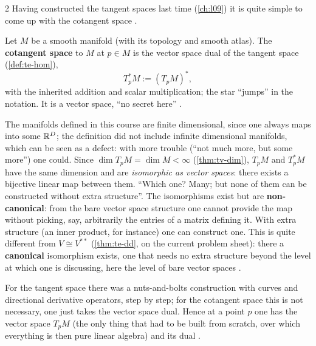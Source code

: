 \begin{paracol}{2}
Having constructed the tangent spaces last time (\cref{ch:l09}) it is quite simple to come up with the cotangent space  .
\begin{definition}\label{def:tb-cotangent}
Let $M$ be a smooth manifold (with its topology and smooth atlas). The \textbf{cotangent space} to $M$ at $p\in M$ is the vector space dual of the tangent space (\cref{def:te-hom}),
\[
  T^*_pM:=(T_pM)^*,
\]
with the inherited addition and scalar multiplication; the star ``jumps'' in the notation. It is a vector space, ``no secret here''    .
\end{definition}
\begin{remark}\label{rem:tb-noncanonical}
The manifolds defined in this course are finite dimensional, since one always maps into some $\mathbb{R}^D$; the definition did not include infinite dimensional manifolds, which can be seen as a defect: with more trouble (``not much more, but some more'') one could. Since $\dim T_pM=\dim M<\infty$ (\cref{thm:tv-dim}),
$T_pM$ and $T^*_pM$ have the same dimension and are \emph{isomorphic as vector spaces}: there exists a bijective linear map between them. ``Which one? Many; but none of them can be constructed without extra structure''. The isomorphisms exist but are \textbf{non-canonical}: from the bare vector space structure
one cannot provide the map without picking, say, arbitrarily the entries of a matrix defining it. With extra structure (an inner product, for instance) one can construct one. This is quite different from $V\cong V^{**}$ (\cref{thm:te-dd}, on the current problem sheet): there a \textbf{canonical} isomorphism exists, one that needs no extra structure beyond the level
at which one is discussing, here the level of bare vector spaces      .
\end{remark}
For the tangent space there was a nuts-and-bolts construction with curves and directional derivative operators, step by step; for the cotangent space this is not necessary, one just takes the vector space dual. Hence at a point $p$ one has the vector space $T_pM$ (the only thing that had to be built from scratch, over which everything is then pure
linear algebra) and its dual  .
\begin{definition}\label{def:tb-tensors}

\end{definition}
\end{paracol}
